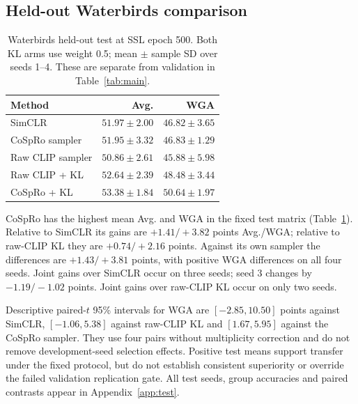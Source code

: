 \documentclass{article}
\begin{document}
\subsection{Held-out Waterbirds comparison}
\begin{table}[htbp]
\centering\small
\setlength{\tabcolsep}{4pt}
\caption{Waterbirds held-out test at SSL epoch 500. Both KL arms use weight 0.5; mean $\pm$ sample SD over seeds 1--4. These are separate from validation in Table~\ref{tab:main}.}
\begin{tabular}{lrr}
\toprule
Method & Avg. & WGA \\
\midrule
SimCLR & $51.97 \pm 2.00$ & $46.82 \pm 3.65$ \\
CoSpRo sampler & $51.95 \pm 3.32$ & $46.83 \pm 1.29$ \\
Raw CLIP sampler & $50.86 \pm 2.61$ & $45.88 \pm 5.98$ \\
Raw CLIP + KL & $52.64 \pm 2.39$ & $48.48 \pm 3.44$ \\
CoSpRo + KL & $53.38 \pm 1.84$ & $50.64 \pm 1.97$ \\
\bottomrule
\end{tabular}
\label{tab:testmain}
\end{table}

CoSpRo has the highest mean Avg. and WGA in the fixed test matrix
(Table~\ref{tab:testmain}). Relative to SimCLR its gains are $+1.41/+3.82$
points Avg./WGA; relative to raw-CLIP KL they are $+0.74/+2.16$ points.
Against its own sampler the differences are $+1.43/+3.81$ points, with
positive WGA differences on all four seeds. Joint gains over SimCLR occur
on three seeds; seed 3 changes by $-1.19/-1.02$ points. Joint gains over
raw-CLIP KL occur on only two seeds.

Descriptive paired-$t$ 95\% intervals for WGA are $[-2.85,10.50]$ points
against SimCLR, $[-1.06,5.38]$ against raw-CLIP KL and $[1.67,5.95]$
against the CoSpRo sampler. They use four pairs without multiplicity
correction and do not remove development-seed selection effects. Positive
test means support transfer under the fixed protocol, but do not establish
consistent superiority or override the failed validation replication gate.
All test seeds, group accuracies and paired contrasts appear in
Appendix~\ref{app:test}.
\end{document}
